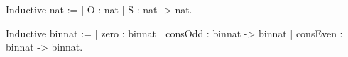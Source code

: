 Inductive nat :=
| O : nat
| S : nat -> nat.


Inductive binnat :=
| zero : binnat
| consOdd : binnat -> binnat
| consEven : binnat -> binnat.
